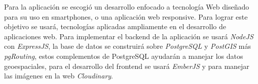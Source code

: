 
Para la aplicación se escogió un desarrollo enfocado a tecnología Web diseñado para su uso en smartphones, o una aplicación web responsive. Para lograr este objetivo se usará, tecnologías aplicadas ampliamente en el desarrollo de aplicaciones web.
Para implementar el backend de la aplicación se usará \emph{NodeJS} con \emph{ExpressJS}, la base de datos se construirá sobre \emph{PostgreSQL} y \emph{PostGIS} más \emph{pgRouting}, estos complementos de PostgreSQL ayudarán a manejar los datos geoespaciales, para el desarrollo del frontend se usará \emph{EmberJS} y para manejar las imágenes en la web \emph{Cloudinary}.\\

